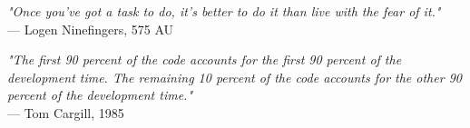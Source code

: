 \begin{flushright}
\emph{"Once you've got a task to do, it's better to do it than live with the fear of it."}\\
 — Logen Ninefingers, 575 AU
\end{flushright}
\vspace{2em}
\begin{flushright}
\emph{"The first 90 percent of the code accounts for the first 90 percent of the development time. The remaining 10 percent of the code accounts for the other 90 percent of the development time."}\\
— Tom Cargill, 1985
\end{flushright}
